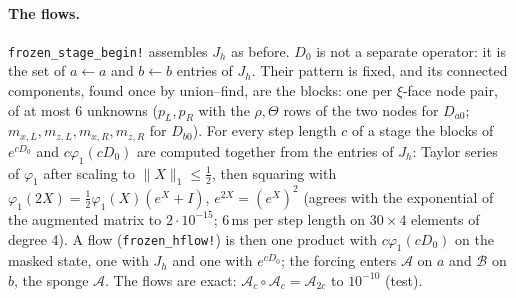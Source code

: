 \documentclass[11pt,a4paper]{article}
\newcommand{\code}[1]{\texttt{#1}}
\begin{document}
\paragraph{The flows.} \code{frozen\_stage\_begin!} assembles $J_h$ as before. $D_0$ is not a separate operator: it is the set of
$a\leftarrow a$ and $b\leftarrow b$ entries of $J_h$. Their pattern is fixed, and its connected components, found once by
union--find, are the blocks: one per $\xi$-face node pair, of at most 6 unknowns ($p_L,p_R$ with the $\rho,\Theta$ rows of the
two nodes for $D_{a0}$; $m_{x,L},m_{z,L},m_{x,R},m_{z,R}$ for $D_{b0}$). For every step length $c$ of a stage the blocks of
$e^{cD_0}$ and $c\varphi_1(cD_0)$ are computed together from the entries of $J_h$: Taylor series of $\varphi_1$ after scaling to
$\|X\|_1\le\tfrac12$, then squaring with $\varphi_1(2X)=\tfrac12\varphi_1(X)(e^X+I)$, $e^{2X}=(e^X)^2$ (agrees with the exponential of
the augmented matrix to $2\cdot10^{-15}$; 6\,ms per step length on $30\times4$ elements of degree 4). A flow
(\code{frozen\_hflow!}) is then one product with $c\varphi_1(cD_0)$ on the masked state, one with $J_h$ and one with $e^{cD_0}$;
the forcing enters $\mathcal A$ on $a$ and $\mathcal B$ on $b$, the sponge $\mathcal A$. The flows are exact:
$\mathcal A_c\circ\mathcal A_c=\mathcal A_{2c}$ to $10^{-10}$ (test).
\end{document}
